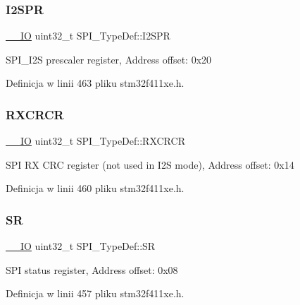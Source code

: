 \subsubsection{\texorpdfstring{I2\+S\+PR}{I2SPR}}
{\footnotesize\ttfamily \hyperlink{core__sc300_8h_aec43007d9998a0a0e01faede4133d6be}{\+\_\+\+\_\+\+IO} uint32\+\_\+t S\+P\+I\+\_\+\+Type\+Def\+::\+I2\+S\+PR}

S\+P\+I\+\_\+\+I2S prescaler register, Address offset\+: 0x20 

Definicja w linii 463 pliku stm32f411xe.\+h.

\mbox{\label{struct_s_p_i___type_def_a60f1f0e77c52e89cfd738999bee5c9d0}} 
\subsubsection{\texorpdfstring{R\+X\+C\+R\+CR}{RXCRCR}}
{\footnotesize\ttfamily \hyperlink{core__sc300_8h_aec43007d9998a0a0e01faede4133d6be}{\+\_\+\+\_\+\+IO} uint32\+\_\+t S\+P\+I\+\_\+\+Type\+Def\+::\+R\+X\+C\+R\+CR}

S\+PI RX C\+RC register (not used in I2S mode), Address offset\+: 0x14 

Definicja w linii 460 pliku stm32f411xe.\+h.

\mbox{\label{struct_s_p_i___type_def_a33f3dd6a505d06fe6c466b63be451891}} 
\subsubsection{\texorpdfstring{SR}{SR}}
{\footnotesize\ttfamily \hyperlink{core__sc300_8h_aec43007d9998a0a0e01faede4133d6be}{\+\_\+\+\_\+\+IO} uint32\+\_\+t S\+P\+I\+\_\+\+Type\+Def\+::\+SR}

S\+PI status register, Address offset\+: 0x08 

Definicja w linii 457 pliku stm32f411xe.\+h.

\mbox{\label{struct_s_p_i___type_def_a0b5a7f6383eb478bbcc22a36c5e95ae6}} 
